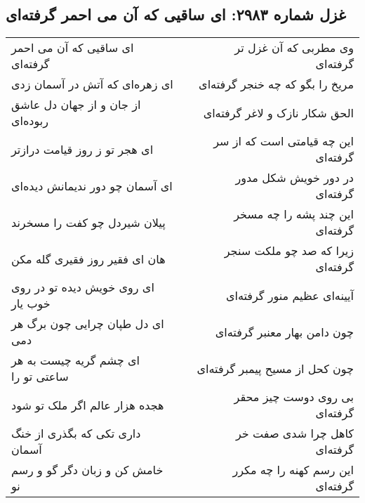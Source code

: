 \begin{center}
\section*{غزل شماره ۲۹۸۳: ای ساقیی که آن می احمر گرفته‌ای}
\label{sec:2983}
\begin{longtable}{l p{0.5cm} r}
ای ساقیی که آن می احمر گرفته‌ای
&&
وی مطربی که آن غزل تر گرفته‌ای
\\
ای زهره‌ای که آتش در آسمان زدی
&&
مریخ را بگو که چه خنجر گرفته‌ای
\\
از جان و از جهان دل عاشق ربوده‌ای
&&
الحق شکار نازک و لاغر گرفته‌ای
\\
ای هجر تو ز روز قیامت درازتر
&&
این چه قیامتی است که از سر گرفته‌ای
\\
ای آسمان چو دور ندیمانش دیده‌ای
&&
در دور خویش شکل مدور گرفته‌ای
\\
پیلان شیردل چو کفت را مسخرند
&&
این چند پشه را چه مسخر گرفته‌ای
\\
هان ای فقیر روز فقیری گله مکن
&&
زیرا که صد چو ملکت سنجر گرفته‌ای
\\
ای روی خویش دیده تو در روی خوب یار
&&
آیینه‌ای عظیم منور گرفته‌ای
\\
ای دل طپان چرایی چون برگ هر دمی
&&
چون دامن بهار معنبر گرفته‌ای
\\
ای چشم گریه چیست به هر ساعتی تو را
&&
چون کحل از مسیح پیمبر گرفته‌ای
\\
هجده هزار عالم اگر ملک تو شود
&&
بی روی دوست چیز محقر گرفته‌ای
\\
داری تکی که بگذری از خنگ آسمان
&&
کاهل چرا شدی صفت خر گرفته‌ای
\\
خامش کن و زبان دگر گو و رسم نو
&&
این رسم کهنه را چه مکرر گرفته‌ای
\\
\end{longtable}
\end{center}
